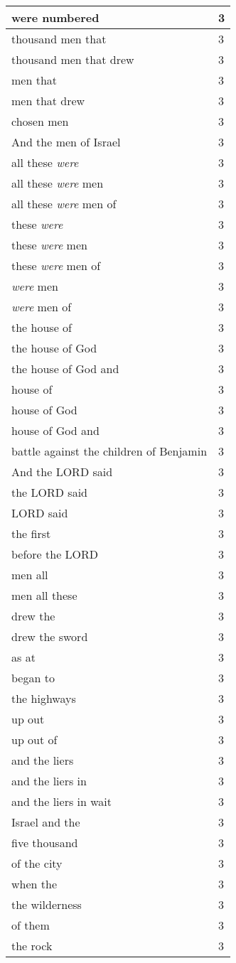 \begin{center}
\begin{longtable}{|p{3.0in}|p{0.5in}|}
were numbered & 3\\ \hline 
thousand men that & 3\\ \hline 
thousand men that drew & 3\\ \hline 
men that & 3\\ \hline 
men that drew & 3\\ \hline 
chosen men & 3\\ \hline 
And the men of Israel & 3\\ \hline 
all these \emph{were} & 3\\ \hline 
all these \emph{were} men & 3\\ \hline 
all these \emph{were} men of & 3\\ \hline 
these \emph{were} & 3\\ \hline 
these \emph{were} men & 3\\ \hline 
these \emph{were} men of & 3\\ \hline 
\emph{were} men & 3\\ \hline 
\emph{were} men of & 3\\ \hline 
the house of & 3\\ \hline 
the house of God & 3\\ \hline 
the house of God and & 3\\ \hline 
house of & 3\\ \hline 
house of God & 3\\ \hline 
house of God and & 3\\ \hline 
battle against the children of Benjamin & 3\\ \hline 
And the LORD said & 3\\ \hline 
the LORD said & 3\\ \hline 
LORD said & 3\\ \hline 
the first & 3\\ \hline 
before the LORD & 3\\ \hline 
men all & 3\\ \hline 
men all these & 3\\ \hline 
drew the & 3\\ \hline 
drew the sword & 3\\ \hline 
as at & 3\\ \hline 
began to & 3\\ \hline 
the highways & 3\\ \hline 
up out & 3\\ \hline 
up out of & 3\\ \hline 
and the liers & 3\\ \hline 
and the liers in & 3\\ \hline 
and the liers in wait & 3\\ \hline 
Israel and the & 3\\ \hline 
five thousand & 3\\ \hline 
of the city & 3\\ \hline 
when the & 3\\ \hline 
the wilderness & 3\\ \hline 
of them & 3\\ \hline 
the rock & 3\\ \hline 
\end{longtable}
\end{center}





